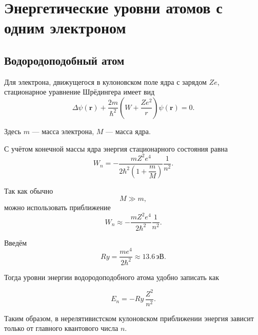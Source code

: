 \documentclass[../final.tex]{subfiles}
\begin{document}

\chapter{Энергетические уровни атомов с одним электроном}



\section{Водородоподобный атом}

Для электрона, движущегося в кулоновском поле ядра с зарядом $Ze$,
стационарное уравнение Шрёдингера имеет вид
%
\begin{equation*}
    \Delta \psi(\mathbf r)
    +
    \frac{2m}{\hbar^2}
    \left(
        W + \frac{Ze^2}{r}
    \right)
    \psi(\mathbf r)
    = 0.
\end{equation*}

Здесь $m$ --- масса электрона, $M$ --- масса ядра.

С учётом конечной массы ядра энергия стационарного состояния равна
%
\begin{equation*}
    W_n
    =
    -\frac{mZ^2e^4}
    {2\hbar^2
    \left(1+\dfrac{m}{M}\right)}
    \frac{1}{n^2}.
\end{equation*}

Так как обычно
%
\[
    M \gg m,
\]
%
можно использовать приближение
%
\begin{equation*}
    W_n
    \approx
    -\frac{mZ^2e^4}{2\hbar^2}
    \frac{1}{n^2}.
\end{equation*}

Введём 
%
\begin{equation*}
    Ry
    =
    \frac{me^4}{2\hbar^2}
    \approx
    13.6\,\text{эВ}.
\end{equation*}

Тогда уровни энергии водородоподобного атома удобно записать как

\[
    E_n
    =
    -Ry\,\frac{Z^2}{n^2}.
\]

Таким образом, в нерелятивистском кулоновском приближении энергия
зависит только от главного квантового числа $n$.
\end{document}
